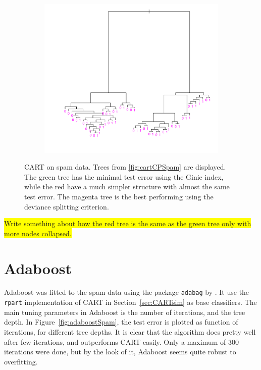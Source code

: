 \begin{figure}[h!tp]
  \begin{subfigure}[b]{0.48\textwidth}
    \includegraphics[width=\textwidth]{./figures/cartOptDevianceSpam.pdf}
  \end{subfigure}
  \vspace{1\baselineskip}
  \caption{CART on spam data. Trees from \ref{fig:cartCPSpam} are displayed. The green tree has the minimal test error using the Ginie index, while the red have a much simpler structure with almost the same test error. The magenta tree is the best performing using the deviance splitting criterion.}
  \label{fig:CartSpam}
\end{figure}
\colorbox{yellow}{Write something about how the red tree is the same as the green tree only with more nodes collapsed.}\\




\section{Adaboost}
\label{sec:SimAdaBoost}
Adaboost was fitted to the spam data using the package \verb+adabag+ by \cite{adabag}. It use the \verb+rpart+ implementation of CART in Section~\ref{sec:CARTsim} as base classifiers. The main tuning parameters in Adaboost is the number of iterations, and the tree depth. In Figure~\ref{fig:adaboostSpam}, the test error is plotted as function of iterations, for different tree depths. It is clear that the algorithm does pretty well after few iterations, and outperforms CART easily. Only a maximum of 300 iterations were done, but by the look of it, Adaboost seems quite robust to overfitting. 


